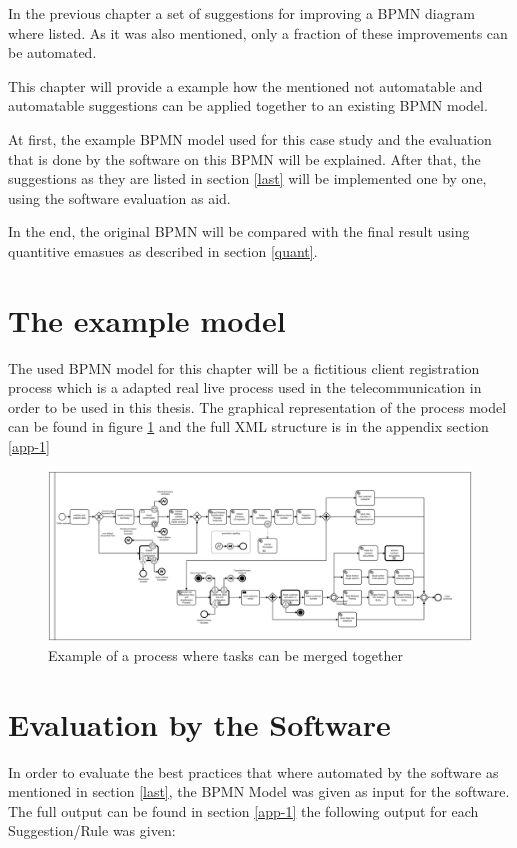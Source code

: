 In the previous chapter a set of suggestions for improving a BPMN diagram where listed. As it was also mentioned, only a fraction of these improvements can be automated. 

This chapter will provide a example how the mentioned not automatable and automatable suggestions can be applied together to an existing BPMN model. 

At first, the example BPMN model used for this case study and the evaluation that is done by the software on this BPMN will be explained. After that, the suggestions as they are listed in section \ref{last} will be implemented one by one, using the software evaluation as aid. 

In the end, the original BPMN will be compared with the final result using quantitive emasues as described in section \ref{quant}.

\section{The example model}
The used BPMN model for this chapter will be a fictitious client registration process which is a adapted real live process used in the telecommunication in order to be used in this thesis. The graphical representation of the process model can be found in figure \ref{fig:example-process} and the full XML structure is in the appendix section \ref{app-1}

\begin{figure}[H]
	\centering
	\includegraphics[width=1.7\columnwidth, angle=90 ]{graphics/process-bpmn.pdf}
	\caption{Example of a process where tasks can be merged together} 
	\label{fig:example-process} 
\end{figure}

\section{Evaluation by the Software}
In order to evaluate the best practices that where automated by the software as mentioned in section \ref{last}, the BPMN Model was given as input for the software. The full output can be found in section \ref{app-1} the following output for each Suggestion/Rule was given:
